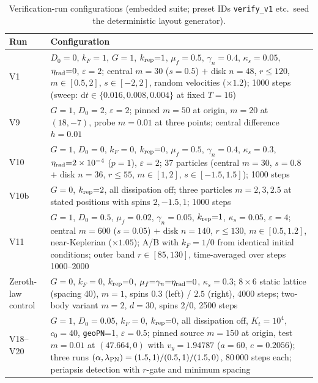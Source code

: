 \documentclass[aps,reprint,amsmath,amssymb,nofootinbib,superscriptaddress,floatfix]{revtex4-2}
\newcommand{\ud}{\mathrm{d}}
\newcommand{\Kt}{K_t}
\newcommand{\Dz}{D_0}
\begin{document}
\begin{table}[h]
\caption{\label{tab:vconfig}%
Verification-run configurations (embedded suite; preset IDs
\texttt{verify\_v1} etc.\ seed the deterministic layout generator).}
\begin{ruledtabular}
\begin{tabular}{lp{}}
Run & Configuration \\
\hline
V1 & $\Dz{=}0$, $k_F{=}1$, $G{=}1$, $k_{\rm rep}{=}1$,
$\mu_f{=}0.5$, $\gamma_n{=}0.4$, $\kappa_s{=}0.05$,
$\eta_{\rm rad}{=}0$, $\varepsilon{=}2$; central $m{=}30$
($s{=}0.5$) $+$ disk $n{=}48$, $r{\le}120$, $m\in[0.5,2]$,
$s\in[-2,2]$, random velocities ($\times1.2$); 1000 steps
(sweep: $\ud t \in \{0.016,0.008,0.004\}$ at fixed $T{=}16$) \\
V9 & $G{=}1$, $\Dz{=}2$, $\varepsilon{=}2$; pinned $m{=}50$ at
origin, $m{=}20$ at $(18,-7)$, probe $m{=}0.01$ at three points;
central difference $h{=}0.01$ \\
V10 & $G{=}1$, $\Dz{=}0$, $k_F{=}0$, $k_{\rm rep}{=}0$,
$\mu_f{=}0.5$, $\gamma_n{=}0.4$, $\kappa_s{=}0.3$,
$\eta_{\rm rad}{=}2\times10^{-4}$ ($p{=}1$), $\varepsilon{=}2$;
37 particles (central $m{=}30$, $s{=}0.8$ $+$ disk $n{=}36$,
$r{\le}55$, $m\in[1,2]$, $s\in[-1.5,1.5]$); 1000 steps \\
V10b & $G{=}0$, $k_{\rm rep}{=}2$, all dissipation off; three
particles $m{=}2,3,2.5$ at stated positions with spins
$2,-1.5,1$; 1000 steps \\
V11 & $G{=}1$, $\Dz{=}0.5$, $\mu_f{=}0.02$, $\gamma_n{=}0.05$,
$k_{\rm rep}{=}1$, $\kappa_s{=}0.05$, $\varepsilon{=}4$; central
$m{=}600$ ($s{=}0.05$) $+$ disk $n{=}140$, $r{\le}130$,
$m\in[0.5,1.2]$, near-Keplerian ($\times1.05$); A/B with
$k_F{=}1/0$ from identical initial conditions; outer band
$r\in[85,130]$, time-averaged over steps 1000--2000 \\
Zeroth-law control & $G{=}0$, $k_F{=}0$, $k_{\rm rep}{=}0$,
$\mu_f{=}\gamma_n{=}\eta_{\rm rad}{=}0$, $\kappa_s{=}0.3$;
$8\times6$ static lattice (spacing 40), $m{=}1$, spins $0.3$
(left) / $2.5$ (right), 4000 steps; two-body variant $m{=}2$,
$d{=}30$, spins $2/0$, 2500 steps \\
V18--V20 & $G{=}1$, $\Dz{=}0.05$, $k_F{=}0$, $k_{\rm rep}{=}0$, all
dissipation off, $\Kt{=}10^4$, $c_0{=}40$, \texttt{geoPN}{=}1,
$\varepsilon{=}0.5$; pinned source $m{=}150$ at origin, test
$m{=}0.01$ at $(47.664,0)$ with $v_y{=}1.94787$ ($a{=}60$,
$e{=}0.2056$); three runs $(\alpha,\lambda_{\rm PN}) =
(1.5,1)/(0.5,1)/(1.5,0)$, 80\,000 steps each; periapsis detection
with $r$-gate and minimum spacing \\
\end{tabular}
\end{ruledtabular}
\end{table}
\end{document}
